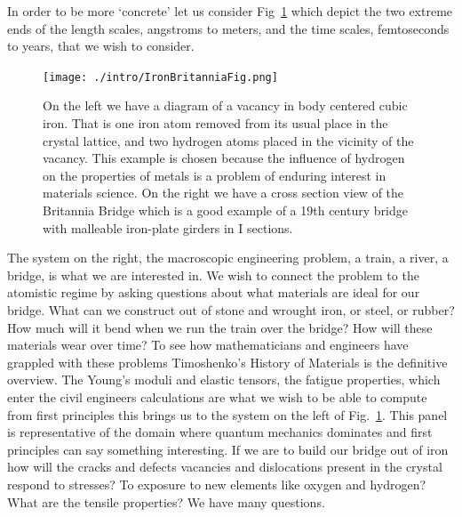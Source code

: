 In order to be more `concrete' let us consider Fig~\ref{fig:britannia} which depict the two
extreme ends of the length scales, angstroms to meters, and the time scales, femtoseconds to years,
that we wish to consider.
%
\begin{figure}
\begin{center}
\texttt{[image: ./intro/IronBritanniaFig.png]}
\end{center}
\caption{On the left we have a diagram of a vacancy in body centered cubic iron. That is one iron 
         atom removed from its usual place in the crystal lattice, and two hydrogen 
         atoms placed in the vicinity of the vacancy. This example is chosen because the influence of
         hydrogen on the properties of metals is a problem of enduring interest in materials science.
         On the right we have a cross section view of the Britannia Bridge which is a good example of a 19th 
         century bridge with malleable iron-plate girders in I sections.\label{fig:britannia}}
\end{figure}



The system on the right, the macroscopic engineering problem, a train, a river, a bridge, is what we
are interested in. We wish to connect the problem to the atomistic regime by asking questions about
what materials are ideal for our bridge. What can we construct out of stone and wrought iron, or steel,
or rubber? How much will it bend when we run the train over the bridge? How will these materials wear over time?
To see how mathematicians and engineers have grappled with these problems Timoshenko's 
History of Materials is the definitive overview. The Young's moduli and elastic tensors, the fatigue properties,
which enter the civil engineers calculations are what we wish to be able to compute from first principles
this brings us to the system on the left of Fig.~\ref{fig:britannia}. This panel is representative of the domain 
where quantum mechanics dominates and first principles can say something interesting. If we are to build
our bridge out of iron how will the cracks and defects vacancies and dislocations present in the crystal
respond to stresses? To exposure to new elements like oxygen and hydrogen? What are the tensile properties?
We have many questions.

